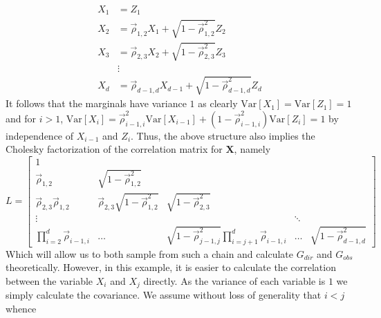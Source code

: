 \documentclass[../Thesis.tex]{subfiles}
\begin{document}
\begin{equation}\label{eq:Gaussian chain def}
    \begin{split}
        X_1 & = Z_1                                                      \\
        X_2 & = \vec{\rho}_{1,2} X_1 + \sqrt{1 - \vec{\rho}_{1,2}^2} Z_2             \\
        X_3 & = \vec{\rho}_{2,3} X_2 + \sqrt{1 - \vec{\rho}_{2,3}^2} Z_3             \\
            & \vdots                                                     \\
        X_d & = \vec{\rho}_{d-1, d} X_{d-1} + \sqrt{1 - \vec{\rho}_{d-1, d}^2} Z_{d}
    \end{split}
\end{equation}
It follows that the marginals have variance $1$ as clearly $\text{Var} \left[X_1\right] = \text{Var}\left[Z_1\right] = 1$ and for $i > 1$, $\text{Var}\left[X_i\right] = \vec{\rho}_{i-1,i}^2 \text{Var}\left[X_{i-1}\right] + \left(1 - \vec{\rho}_{i-1,i}^2\right) \text{Var} \left[Z_i\right] = 1$ by independence of $X_{i-1}$ and $Z_i$. Thus, the above structure also implies the Cholesky factorization of the correlation matrix for $\boldsymbol X$, namely
$$L = \begin{bmatrix}
        1                          &                                   &                                                        &        &                          \\
        \vec{\rho}_{1,2}                 & \sqrt{1 - \vec{\rho}_{1,2}^2}           &                                                        &        &                          \\
        \vec{\rho}_{2,3}\vec{\rho}_{1,2}       & \vec{\rho}_{2,3}\sqrt{1 - \vec{\rho}_{1,2}^2} & \sqrt{1 - \vec{\rho}_{2,3}^2}                                &        &                          \\
        \vdots                     &                                   &                                                        & \ddots &                          \\
        \prod_{i=2}^d \vec{\rho}_{i-1,i} & \dots                             & \sqrt{1 - \vec{\rho}_{j-1,j}^2} \prod_{i=j+1}^d \vec{\rho}_{i-1,i} & \dots  & \sqrt{1- \vec{\rho}_{d-1,d}^2}
    \end{bmatrix}$$
Which will allow us to both sample from such a chain and calculate $G_{dir}$ and $G_{obs}$ theoretically. However, in this example, it is easier to calculate the correlation between the variable $X_i$ and $X_j$ directly. As the variance of each variable is $1$ we simply calculate the covariance. We assume without loss of generality that $i < j$ whence
\end{document}
